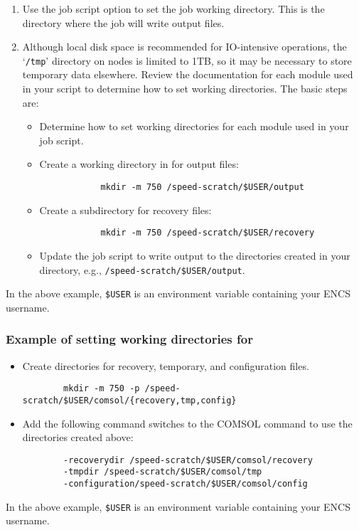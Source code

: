 \begin{enumerate}
	\item Use the  job script option to set the job working directory.
	This is the directory where the job will write output files.

 	\item Although local disk space is recommended for IO-intensive operations, the 
 	`\texttt{/tmp}' directory on  nodes is limited to 1TB, so it may be necessary 
	to store temporary data elsewhere. Review the documentation for each module
	used in your script to determine how to set working directories.
	The basic steps are:
	\begin{itemize}
		\item
		Determine how to set working directories for each module used in your job script.
		\item
		Create a working directory in  for output files:
		\begin{verbatim}
			mkdir -m 750 /speed-scratch/$USER/output
		\end{verbatim}
		\item
		Create a subdirectory for recovery files:
		\begin{verbatim}
			mkdir -m 750 /speed-scratch/$USER/recovery
		\end{verbatim}
		\item
		Update the job script to write output to the directories created in your 
		 directory, e.g., \verb!/speed-scratch/$USER/output!.
	\end{itemize}
\end{enumerate}
\noindent In the above example, \verb!$USER! is an environment variable containing your ENCS username.

\subsubsection{Example of setting working directories for }

\begin{itemize}
	\item Create directories for recovery, temporary, and configuration files. 
	\begin{verbatim}
		mkdir -m 750 -p /speed-scratch/$USER/comsol/{recovery,tmp,config}
	\end{verbatim}
	\item Add the following command switches to the COMSOL command to use the 
	directories created above:
	\begin{verbatim} 
		-recoverydir /speed-scratch/$USER/comsol/recovery 
		-tmpdir /speed-scratch/$USER/comsol/tmp
		-configuration/speed-scratch/$USER/comsol/config
	\end{verbatim}
\end{itemize} 
\noindent In the above example, \verb!$USER! is an environment variable containing your ENCS username.

